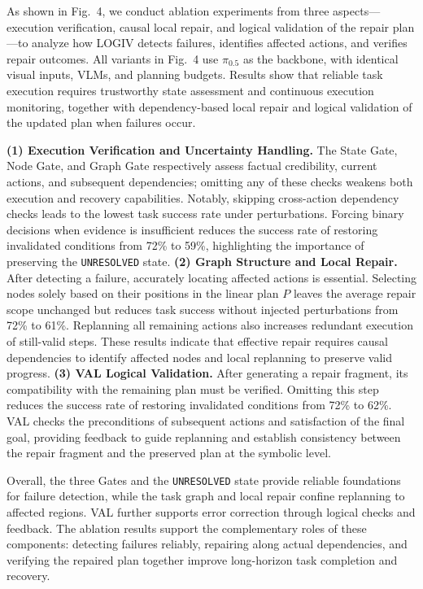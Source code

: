 \documentclass[letterpaper,10pt,conference]{ieeeconf}
\begin{document}
As shown in Fig.~4, we conduct ablation experiments from three aspects---execution verification, causal local repair, and logical validation of the repair plan---to analyze how LOGIV detects failures, identifies affected actions, and verifies repair outcomes. All variants in Fig.~4 use $\pi_{0.5}$ as the backbone, with identical visual inputs, VLMs, and planning budgets. Results show that reliable task execution requires trustworthy state assessment and continuous execution monitoring, together with dependency-based local repair and logical validation of the updated plan when failures occur.

\textbf{(1) Execution Verification and Uncertainty Handling.}
The State Gate, Node Gate, and Graph Gate respectively assess factual credibility, current actions, and subsequent dependencies; omitting any of these checks weakens both execution and recovery capabilities. Notably, skipping cross-action dependency checks leads to the lowest task success rate under perturbations. Forcing binary decisions when evidence is insufficient reduces the success rate of restoring invalidated conditions from 72\% to 59\%, highlighting the importance of preserving the \texttt{UNRESOLVED} state.
\textbf{(2) Graph Structure and Local Repair.}
After detecting a failure, accurately locating affected actions is essential. Selecting nodes solely based on their positions in the linear plan $P$ leaves the average repair scope unchanged but reduces task success without injected perturbations from 72\% to 61\%. Replanning all remaining actions also increases redundant execution of still-valid steps. These results indicate that effective repair requires causal dependencies to identify affected nodes and local replanning to preserve valid progress.
\textbf{(3) VAL Logical Validation.}
After generating a repair fragment, its compatibility with the remaining plan must be verified. Omitting this step reduces the success rate of restoring invalidated conditions from 72\% to 62\%. VAL checks the preconditions of subsequent actions and satisfaction of the final goal, providing feedback to guide replanning and establish consistency between the repair fragment and the preserved plan at the symbolic level.

Overall, the three Gates and the \texttt{UNRESOLVED} state provide reliable foundations for failure detection, while the task graph and local repair confine replanning to affected regions. VAL further supports error correction through logical checks and feedback. The ablation results support the complementary roles of these components: detecting failures reliably, repairing along actual dependencies, and verifying the repaired plan together improve long-horizon task completion and recovery.
\end{document}
